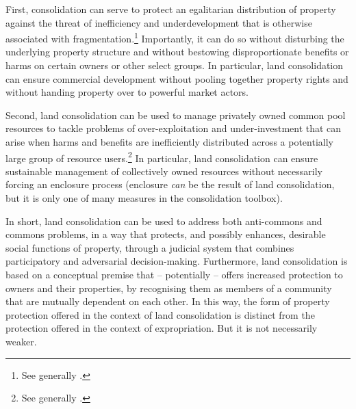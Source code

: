 First, consolidation can serve to protect an egalitarian distribution of property against the threat of inefficiency and underdevelopment that is otherwise associated with fragmentation.\footnote{See generally \cite{heller98}.} Importantly, it can do so without disturbing the underlying property structure and without bestowing disproportionate benefits or harms on certain owners or other select groups. In particular, land consolidation can ensure commercial development without pooling together property rights and without handing property over to powerful market actors. 

Second, land consolidation can be used to manage privately owned common pool resources to tackle problems of over-exploitation and under-investment that can arise when harms and benefits are inefficiently distributed across a potentially large group of resource users.\footnote{See generally \cite{hardin68,demsetz67}.} In particular, land consolidation can ensure sustainable management of collectively owned resources without necessarily forcing an enclosure process (enclosure {\it can} be the result of land consolidation, but it is only one of many measures in the consolidation toolbox).

In short, land consolidation can be used to address both anti-commons and commons problems, in a way that protects, and possibly enhances, desirable social functions of property, through a judicial system that combines participatory and adversarial decision-making. Furthermore, land consolidation is based on a conceptual premise that -- potentially -- offers increased protection to owners and their properties, by recognising them as members of a community that are mutually dependent on each other. In this way, the form of property protection offered in the context of land consolidation is distinct from the protection offered in the context of expropriation. But it is not necessarily weaker.


